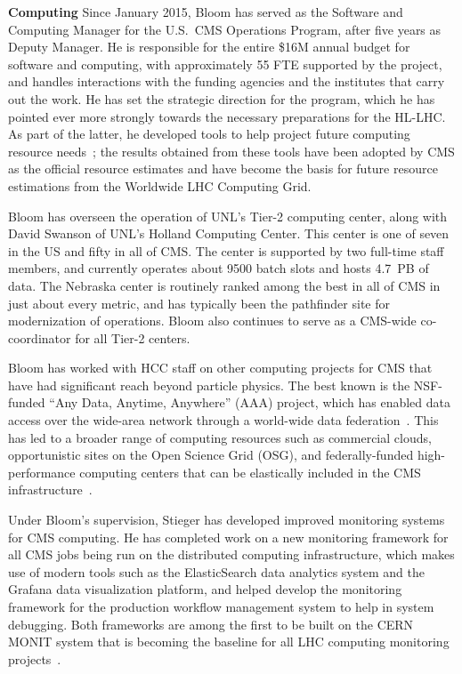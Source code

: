 {\bf Computing} Since January 2015, Bloom has served as the Software and
Computing Manager for the U.S.~CMS Operations Program, after
five years as Deputy Manager.  He is responsible for the entire \$16M
annual budget for software and computing, with approximately 55 FTE
supported by the project, and handles interactions with the funding
agencies and the institutes that carry out the work.  He
has set the strategic direction for the program, which he has pointed ever
more strongly towards the necessary preparations for the HL-LHC.  As part
of the latter, he developed tools to help project future computing resource
needs~\cite{bib:resource-modeling}; the results obtained from these tools
have been adopted by CMS as the official resource estimates and have
become the basis for future resource estimations from the Worldwide LHC
Computing Grid.

Bloom has overseen the operation of UNL's Tier-2 computing center, along with David Swanson of UNL's Holland Computing Center. This center is one of seven in the US and fifty in all of CMS. The center is supported by two full-time staff members, and currently operates about 9500 batch slots and hosts 4.7~PB of data. The Nebraska center is routinely ranked among the best in all of CMS in just about every metric, and has typically been the pathfinder site for modernization of operations. Bloom also continues to serve as a CMS-wide co-coordinator for all Tier-2 centers.

Bloom has worked with HCC staff on other computing projects for CMS that have had significant reach beyond particle physics.  The best known is the NSF-funded ``Any Data, Anytime, Anywhere'' (AAA) project, which has enabled data access over the wide-area network through a world-wide data federation~\cite{bib:AAA}.  This has led to a broader range of computing resources such as commercial clouds, opportunistic sites on the Open Science Grid (OSG), and federally-funded high-performance computing centers that can be elastically included in the CMS infrastructure~\cite{bib:hepcloud}.

Under Bloom's supervision, Stieger has developed improved monitoring systems for CMS computing. He has completed work on a new monitoring framework for all CMS jobs being run on the distributed computing infrastructure, which makes use of modern tools such as the ElasticSearch data analytics system and the Grafana data visualization platform, and helped develop the monitoring framework for the production workflow management system to help in system debugging.  Both frameworks are among the first to be built on the CERN MONIT system that is becoming the baseline for all LHC computing monitoring projects~\cite{bib:MONIT}.

